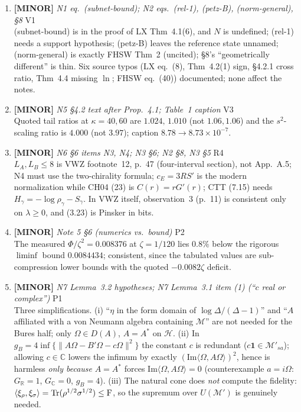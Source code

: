 \documentclass[11pt]{article}
\begin{document}
\begin{enumerate}[leftmargin=1.6em,itemsep=6pt]
\item \textbf{[MINOR]} \emph{N1 eq.\ (subnet-bound); N2 eqs.\ (rel-1), (petz-B), (norm-general), \S8} \hfill\textsc{V1}\\ (subnet-bound) is in the proof of LX Thm~4.1(6), and \(N\) is undefined; (rel-1) needs a support hypothesis; (petz-B) leaves the reference state unnamed; (norm-general) is exactly FHSW Thm~2 (uncited); \S8's ``geometrically different'' is thin. Six source typos (LX eq.~(8), Thm~4.2(1) sign, \S4.2.1 cross ratio, Thm~4.4 missing \(\ln\); FHSW eq.~(40)) documented; none affect the notes.
\item \textbf{[MINOR]} \emph{N5 \S4.2 text after Prop.~4.1; Table~1 caption} \hfill\textsc{V3}\\ Quoted tail ratios at \(\kappa=40,60\) are \(1.024,\,1.010\) (not \(1.06,1.06\)) and the \(s^2\)-scaling ratio is \(4.000\) (not \(3.97\)); caption \(8.78\to8.73\times10^{-7}\).
\item \textbf{[MINOR]} \emph{N6 \S6 items N3, N4; N3 \S6; N2 \S8, N3 \S5} \hfill\textsc{R4}\\ \(L_A,L_B\le8\) is VWZ footnote~12, p.~47 (four-interval section), not App.~A.5; N4 must use the two-chirality formula; \(c_E=3RS'\) is the modern normalization while CH04 (23) is \(C(r)=rG'(r)\); CTT (7.15) needs \(H_\gamma=-\log\rho_\gamma-S_\gamma\). In VWZ itself, observation~3 (p.~11) is consistent only on \(\lambda\ge0\), and (3.23) is Pinsker in bits.
\item \textbf{[MINOR]} \emph{Note 5 \S6 (numerics vs.\ bound)} \hfill\textsc{P2}\\ The measured \(\Phi/\zeta^2=0.008376\) at \(\zeta=1/120\) lies \(0.8\%\) below the rigorous \(\liminf\) bound \(0.0084434\); consistent, since the tabulated values are sub-compression lower bounds with the quoted \(-0.0082\zeta\) deficit.
\item \textbf{[MINOR]} \emph{N7 Lemma~3.2 hypotheses; N7 Lemma~3.1 item (1) (``\(c\) real or complex'')} \hfill\textsc{P1}\\ Three simplifications. (i) ``\(\eta\) in the form domain of \(\log\Delta/(\Delta-1)\)'' and ``\(A\) affiliated with a von Neumann algebra containing \(\mathcal M\)'' are not needed for the Bures half; only \(\Omega\in D(A)\), \(A=A^*\) on \(\mathcal H\). (ii) In \(g_B=4\inf\{\|A\Omega-B'\Omega-c\Omega\|^2\}\) the constant \(c\) is redundant (\(c\mathbf 1\in\mathcal M'_{sa}\)); allowing \(c\in\mathbb C\) lowers the infimum by exactly \((\mathrm{Im}\langle\Omega,A\Omega\rangle)^2\), hence is harmless \emph{only because} \(A=A^*\) forces \(\mathrm{Im}\langle\Omega,A\Omega\rangle=0\) (counterexample \(a=i\Omega\): \(G_{\mathbb R}=1\), \(G_{\mathbb C}=0\), \(g_B=4\)). (iii) The natural cone does \emph{not} compute the fidelity: \(\langle\xi_\rho,\xi_\sigma\rangle=\operatorname{Tr}(\rho^{1/2}\sigma^{1/2})\le\operatorname{F}\), so the supremum over \(U(\mathcal M')\) is genuinely needed.

\end{enumerate}
\end{document}

